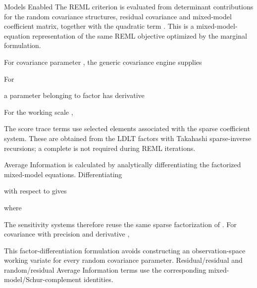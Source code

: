 \documentclass[a4paper]{book}
\begin{document}
\begin{Section}{Models Enabled}
The REML criterion is evaluated from determinant contributions for the random
covariance structures, residual covariance and mixed-model coefficient matrix,
together with the quadratic term . This is a
mixed-model-equation representation of the same REML objective optimized by
the marginal formulation.

For covariance parameter , the generic covariance engine supplies


For


a parameter belonging to factor  has derivative


For the working scale ,


The score trace terms use selected elements associated with the sparse
coefficient system. These are obtained from the LDLT factors with Takahashi
sparse-inverse recursions; a complete  is not required during REML
iterations.

Average Information is calculated by analytically differentiating the
factorized mixed-model equations. Differentiating


with respect to  gives


where


The sensitivity systems therefore reuse the same sparse factorization of
. For covariance \eqn{\Sigma}{} with precision
 and derivative
,


This factor-differentiation formulation avoids constructing an
observation-space working variate for every random covariance parameter.
Residual/residual and random/residual Average Information terms use the
corresponding mixed-model/Schur-complement identities.


\end{Section}
\end{document}

